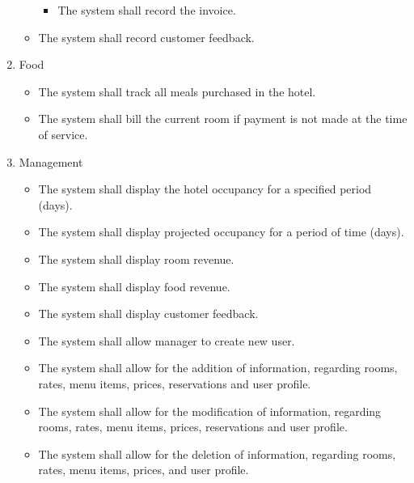 \begin{enumerate}
\begin{itemize}
\begin{itemize}
                \item The system shall record the invoice.
            \end{itemize}
            \item The system shall record customer feedback.
        \end{itemize}
        \item Food
        \begin{itemize}
            \item The system shall track all meals purchased in the hotel.
            \item The system shall bill the current room if payment is not made at the time of service.
        \end{itemize}
        \item Management 
        \begin{itemize}
            \item The system shall display the hotel occupancy for a specified period (days).
            \item The system shall display projected occupancy for a period of time (days).
            \item The system shall display room revenue.
            \item The system shall display food revenue.
            \item The system shall display customer feedback.
            \item The system shall allow manager to create new user.
            \item The system shall allow for the addition of information, regarding rooms, rates, menu items, prices, reservations and user profile.
            \item The system shall allow for the modification of information, regarding rooms, rates, menu items, prices, reservations and user profile.
            \item The system shall allow for the deletion of information, regarding rooms, rates, menu items, prices, and user profile.
        \end{itemize}
    \end{enumerate}
